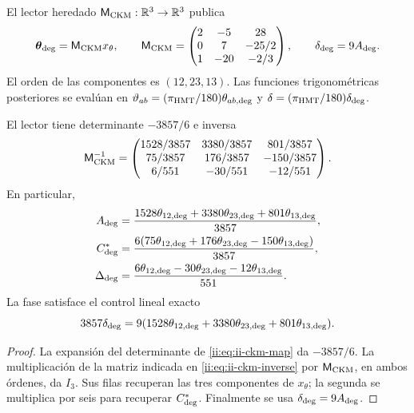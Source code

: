 \begin{definition}
El lector heredado \(\mathsf M_{\rm CKM}:\mathbb R^3\to\mathbb R^3\)
publica
\begin{equation}
 \boldsymbol\theta_{\rm deg}=\mathsf M_{\rm CKM}x_\theta,
 \qquad
 \mathsf M_{\rm CKM}=
 \begin{pmatrix}
 2&-5&28\\
 0&7&-25/2\\
 1&-20&-2/3
 \end{pmatrix},
 \qquad
 \delta_{\rm deg}=9A_{\rm deg}.
 \label{ii:eq:ii-ckm-map}
\end{equation}
El orden de las componentes es \((12,23,13)\). Las funciones
trigonométricas posteriores se evalúan en
\(\vartheta_{ab}=(\pi_{\rm HMT}/180)\theta_{ab,\rm deg}\) y
\(\delta=(\pi_{\rm HMT}/180)\delta_{\rm deg}\).
\end{definition}

\begin{proposition}
El lector tiene determinante \(-3857/6\) e inversa
\begin{equation}
 \mathsf M_{\rm CKM}^{-1}=
 \begin{pmatrix}
 1528/3857&3380/3857&801/3857\\
 75/3857&176/3857&-150/3857\\
 6/551&-30/551&-12/551
 \end{pmatrix}.
 \label{ii:eq:ii-ckm-inverse}
\end{equation}
En particular,
\begin{align}
 A_{\rm deg}
 &=\frac{1528\theta_{12,\rm deg}+3380\theta_{23,\rm deg}
          +801\theta_{13,\rm deg}}{3857},\nonumber\\
 C^*_{\rm deg}
 &=\frac{6(75\theta_{12,\rm deg}+176\theta_{23,\rm deg}
          -150\theta_{13,\rm deg})}{3857},\nonumber\\
 \Delta_{\rm deg}
 &=\frac{6\theta_{12,\rm deg}-30\theta_{23,\rm deg}
          -12\theta_{13,\rm deg}}{551}.
 \label{ii:eq:ii-ckm-recover}
\end{align}
La fase satisface el control lineal exacto
\begin{equation}
 3857\delta_{\rm deg}
 =9(1528\theta_{12,\rm deg}+3380\theta_{23,\rm deg}
      +801\theta_{13,\rm deg}).
 \label{ii:eq:ii-ckm-phase-check}
\end{equation}
\end{proposition}

\begin{proof}
La expansión del determinante de \eqref{ii:eq:ii-ckm-map} da
\(-3857/6\). La multiplicación de la matriz indicada en
\eqref{ii:eq:ii-ckm-inverse} por \(\mathsf M_{\rm CKM}\), en ambos
órdenes, da \(I_3\). Sus filas recuperan las tres componentes de
\(x_\theta\); la segunda se multiplica por seis para recuperar
\(C^*_{\rm deg}\). Finalmente se usa
\(\delta_{\rm deg}=9A_{\rm deg}\).
\end{proof}

